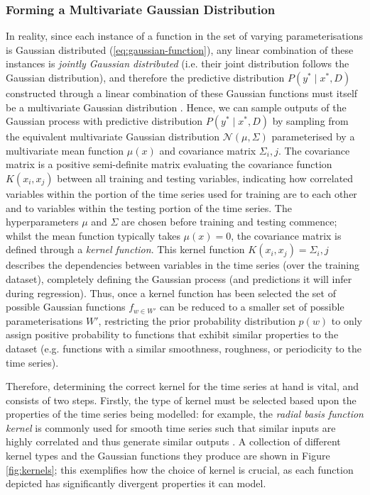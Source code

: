 \documentclass[a4paper, 11pt]{article}
\begin{document}
    \subsubsection{Forming a Multivariate Gaussian Distribution}

    In reality, since each instance of a function in the set of varying parameterisations is Gaussian distributed (\ref{eq:gaussian-function}), any linear combination of these instances is \emph{jointly Gaussian distributed} (i.e. their joint distribution follows the Gaussian distribution), and therefore the predictive distribution $P(y^* \mid x^*, D)$ constructed through a linear combination of these Gaussian functions must itself be a multivariate Gaussian distribution \cite{alvarez-2011}. Hence, we can sample outputs of the Gaussian process with predictive distribution $P(y^* \mid x^*, D)$ by sampling from the equivalent multivariate Gaussian distribution $\mathcal{N}(\mu, \Sigma)$ parameterised by a multivariate mean function $\mu(x)$ and covariance matrix $\Sigma_i,j$. The covariance matrix is a positive semi-definite matrix \cite{rasmussen-2006} evaluating the covariance function $K(x_i, x_j)$ between all training and testing variables, indicating how correlated variables within the portion of the time series used for training are to each other and to variables within the testing portion of the time series. The hyperparameters $\mu$ and $\Sigma$ are chosen before training and testing commence; whilst the mean function typically takes $\mu(x) = 0$, the covariance matrix is defined through a \emph{kernel function}. This kernel function $K(x_i, x_j) = \Sigma_i,j$ describes the dependencies between variables in the time series (over the training dataset), completely defining the Gaussian process (and predictions it will infer during regression). Thus, once a kernel function has been selected the set of possible Gaussian functions $f_{w \in W'}$ can be reduced to a smaller set of possible parameterisations $W'$, restricting the prior probability distribution $p(w)$ to only assign positive probability to functions that exhibit similar properties to the dataset (e.g. functions with a similar smoothness, roughness, or periodicity to the time series).

    Therefore, determining the correct kernel for the time series at hand is vital, and consists of two steps. Firstly, the type of kernel must be selected based upon the properties of the time series being modelled: for example, the \emph{radial basis function kernel} is commonly used for smooth time series such that similar inputs are highly correlated and thus generate similar outputs \cite{sollich-2005}. A collection of different kernel types and the Gaussian functions they produce are shown in Figure \ref{fig:kernels}; this exemplifies how the choice of kernel is crucial, as each function depicted has significantly divergent properties it can model. 
\end{document}

